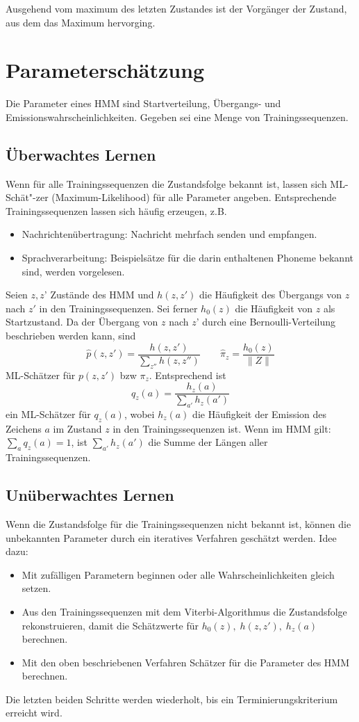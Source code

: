 Ausgehend vom maximum des letzten Zustandes ist der Vorgänger der Zustand, aus dem das Maximum hervorging.

\section{Parameterschätzung}
Die Parameter eines HMM sind Startverteilung, Übergangs- und Emissionswahrscheinlichkeiten.
Gegeben sei eine Menge von Trainingssequenzen.

\subsection{Überwachtes Lernen}
Wenn für alle Trainingssequenzen die Zustandsfolge bekannt ist, lassen sich ML-Schät"-zer (Maximum-Likelihood) für alle Parameter angeben.
Entsprechende Trainingssequenzen lassen sich häufig erzeugen, z.B.
\begin{itemize}
	\item Nachrichtenübertragung: Nachricht mehrfach senden und empfangen.
	\item Sprachverarbeitung: Beispielsätze für die darin enthaltenen Phoneme bekannt sind, werden vorgelesen.
\end{itemize}
Seien \(z,z\)' Zustände des HMM und \(h(z,z')\) die Häufigkeit des Übergangs von \(z\) nach \(z'\) in den Trainingssequenzen.
Sei ferner \(h_0(z)\) die Häufigkeit von \(z\) als Startzustand.
Da der Übergang von \(z\) nach \(z\)' durch eine Bernoulli-Verteilung beschrieben werden kann, sind
\[
	\hat{p}(z,z')=\frac{h(z,z')}{\sum\limits_{z''} h(z,z'')} \qquad
	\hat\pi_z=\frac{h_0(z)}{\|Z\|}
\]
ML-Schätzer für \(p(z,z')\) bzw \(\pi_z\).
Entsprechend ist
\[
	\hat{q}_z(a)=\frac{h_z(a)}{\sum\limits_{a'} h_z(a')}
\]
ein ML-Schätzer für \(q_z(a)\), wobei \(h_z(a)\) die Häufigkeit der Emission des Zeichens \(a\) im Zustand \(z\) in den Trainingssequenzen ist.
Wenn im HMM gilt: \(\sum_a q_z(a)=1\), ist \(\sum_{a'} h_z(a')\) die Summe der Längen aller Trainingssequenzen.

\subsection{Unüberwachtes Lernen}
Wenn die Zustandsfolge für die Trainingssequenzen nicht bekannt ist, können die unbekannten Parameter durch ein iteratives Verfahren geschätzt werden.
Idee dazu:
\begin{itemize}
	\item Mit zufälligen Parametern beginnen oder alle Wahrscheinlichkeiten gleich setzen.
	\item Aus den Trainingssequenzen mit dem Viterbi-Algorithmus die Zustandsfolge rekonstruieren, damit die Schätzwerte für \(h_0(z),\; h(z,z'),\; h_z(a)\) berechnen.
	\item Mit den oben beschriebenen Verfahren Schätzer für die Parameter des HMM berechnen.
\end{itemize}
Die letzten beiden Schritte werden wiederholt, bis ein Terminierungskriterium erreicht wird.

